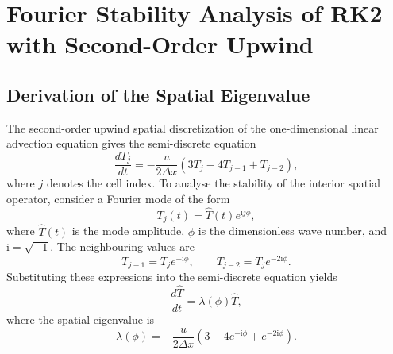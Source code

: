 
\section{Fourier Stability Analysis of RK2 with Second-Order Upwind}
\label{app:rk2-upwind-stability}

\subsection{Derivation of the Spatial Eigenvalue}
\label{app:rk2-upwind-eigenvalue}

The second-order upwind spatial discretization of the one-dimensional linear advection equation gives the semi-discrete equation
\begin{equation}
    \frac{dT_j}{dt}
    =-\frac{u}{2\Delta x}
    \left(3T_j-4T_{j-1}+T_{j-2}\right),
    \label{eq:app-rk2-upwind-semidiscrete}
\end{equation}
where $j$ denotes the cell index. To analyse the stability of the interior spatial operator, consider a Fourier mode of the form
\begin{equation}
    T_j(t)=\hat{T}(t)e^{\mathrm{i}j\phi},
    \label{eq:app-rk2-upwind-fourier-mode}
\end{equation}
where $\hat{T}(t)$ is the mode amplitude, $\phi$ is the dimensionless wave number, and $\mathrm{i}=\sqrt{-1}$. The neighbouring values are
\begin{equation}
    T_{j-1}=T_j e^{-\mathrm{i}\phi},
    \qquad
    T_{j-2}=T_j e^{-2\mathrm{i}\phi}.
    \label{eq:app-rk2-upwind-neighbours}
\end{equation}
Substituting these expressions into the semi-discrete equation yields
\begin{equation}
    \frac{d\hat{T}}{dt}=\lambda(\phi)\hat{T},
    \label{eq:app-rk2-upwind-mode-ode}
\end{equation}
where the spatial eigenvalue is
\begin{equation}
    \boxed{
    \lambda(\phi)=-\frac{u}{2\Delta x}
    \left(3-4e^{-\mathrm{i}\phi}+e^{-2\mathrm{i}\phi}\right)
    }.
    \label{eq:app-rk2-upwind-lambda}
\end{equation}

